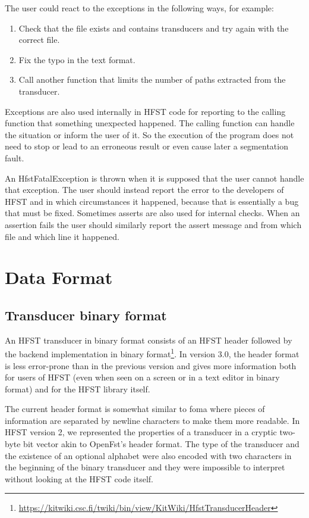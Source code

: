 \documentclass{llncs}
\begin{document}
The user could react to the exceptions in the following ways, for
example:

\begin{enumerate} 
\item Check that the file exists and contains transducers and try again
with the correct file.
\item Fix the typo in the text format.
\item Call another function that limits the number of paths extracted
from the transducer.
\end{enumerate} 

Exceptions are also used internally in HFST code for reporting to the 
calling function that something unexpected happened. The calling
function can handle the situation or inform the user of it. 
So the execution of the program does not need to stop or lead to an
erroneous result or even cause later a segmentation fault.

An HfstFatalException is thrown when it is supposed that the user
cannot handle that exception. The user should instead report the error
to the developers of HFST and in which circumstances it happened, because that
is essentially a bug that must be fixed. Sometimes asserts are also
used for internal checks. When an assertion fails the user should similarly
report the assert message and from which file and which line it happened.


\section{Data Format}

\subsection{Transducer binary format}

An HFST transducer in binary format consists of an HFST header followed by the
backend implementation in binary 
format\footnote{\url{https://kitwiki.csc.fi/twiki/bin/view/KitWiki/HfstTransducerHeader}}. 
In version 3.0, the header
format is less error-prone than in the previous version and gives more 
information both for users of HFST (even when seen on a screen or in a
text editor in binary format) and for the HFST library itself.
 
The current header format is somewhat similar to foma where pieces of 
information are separated by newline characters to make them more
readable. In HFST version 2, we represented the properties of a
transducer in a cryptic two-byte bit vector akin to OpenFst's header
format. The type of the transducer and the existence of an optional
alphabet were also encoded with two characters in the beginning of the
binary transducer and they were impossible to interpret without
looking at the HFST code itself.
\end{document}
